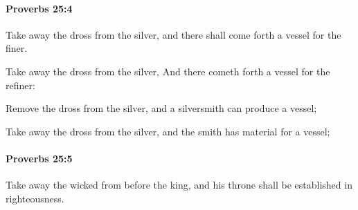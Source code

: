 		\paragraph{Proverbs 25:4} %
			\label{PROVERBS-25-4}

			Take away the dross from the silver, and there shall come forth a vessel for the finer.

			\begin{versebox}
					\item[BHS] 
					\item[ASV] Take away the dross from the silver, And there cometh forth a vessel for the refiner:
					\item[NIV] Remove the dross from the silver, and a silversmith can produce a vessel;
					\item[NRSV] Take away the dross from the silver, and the smith has material for a vessel;
			\end{versebox}

		\paragraph{Proverbs 25:5} %
			\label{PROVERBS-25-5}

			Take away the wicked from before the king, and his throne shall be established in righteousness.

